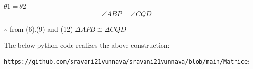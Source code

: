 \documentclass[10pt, a4paper]{article}
\begin{document}
			\begin{center}$\theta1 = \theta2$\\
			
			\begin{equation}
	 		 \angle {ABP} = \angle {CQD}
			\end{equation}
	\end{center}
	\begin{center}
$\therefore$ from (6),(9) and (12)
$\Delta APB \cong \Delta CQD$ 
	\end{center}
The below python code realizes the above construction:	\\
\begin{lstlisting}
https://github.com/sravani21vunnava/sravani21vunnava/blob/main/Matrices_line/codes/matrix_line.py
\end{lstlisting} 	

\end{document}
